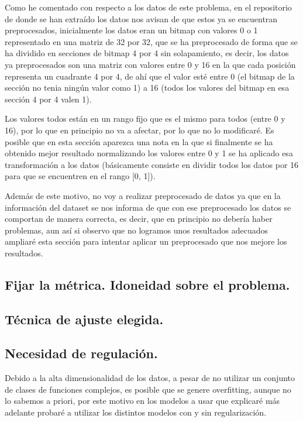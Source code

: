 \documentclass[12pt, spanish]{article}
\begin{document}
Como he comentado con respecto a los datos de este problema, en el repositorio de donde se han extraído los datos nos avisan de que estos ya se encuentran preprocesados, inicialmente los datos eran un bitmap con valores 0 o 1 representado en una matriz de 32 por 32, que se ha preprocesado de forma que se ha dividido en secciones de bitmap 4 por 4 sin solapamiento, es decir, los datos ya preprocesados son una matriz con valores entre 0 y 16 en la que cada posición representa un cuadrante 4 por 4, de ahí que el valor esté entre 0 (el bitmap de la sección no tenia ningún valor como 1) a 16 (todos los valores del bitmap en esa sección 4 por 4 valen 1).

Los valores todos están en un rango fijo que es el mismo para todos (entre 0 y 16), por lo que en principio no va a afectar, por lo que no lo modificaré. Es posible que en esta sección aparezca una nota en la que si finalmente se ha obtenido mejor resultado normalizando los valores entre 0 y 1 se ha aplicado esa transformación a los datos (básicamente consiste en dividir todos los datos por 16 para que se encuentren en el rango [0, 1]).

Además de este motivo, no voy a realizar preprocesado de datos ya que en la información del dataset se nos informa de que con ese preprocesado los datos se comportan de manera correcta, es decir, que en principio no debería haber problemas, aun así si observo que no logramos unos resultados adecuados ampliaré esta sección para intentar aplicar un preprocesado que nos mejore los resultados.

\subsection{Fijar la métrica. Idoneidad sobre el problema.}

\subsection{Técnica de ajuste elegida.}

\subsection{Necesidad de regulación.}

Debido a la alta dimensionalidad de los datos, a pesar de no utilizar un conjunto de clases de funciones complejos, es posible que se genere overfitting, aunque no lo sabemos a priori, por este motivo en los modelos a usar que explicaré más adelante probaré a utilizar los distintos modelos con y sin regularización.
\end{document}
